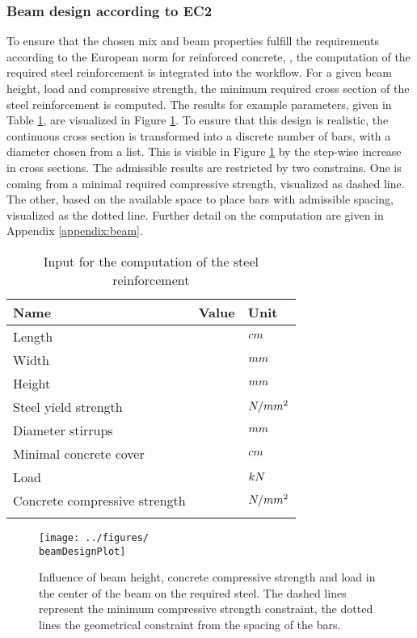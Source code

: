 \subsubsection{Beam design according to EC2}
To ensure that the chosen mix and beam properties fulfill the requirements according to the European norm for reinforced concrete, \cite{DIN1992-1-1}, the computation of the required steel reinforcement is integrated into the workflow.
For a given beam height, load and compressive strength, the minimum required cross section of the steel reinforcement is computed.
The results for example parameters, given in Table \ref{tab:beamdesigninput}, are visualized in Figure \ref{fig:beamdesign}.
To ensure that this design is realistic, the continuous cross section is transformed into a discrete number of bars, with a diameter chosen from a list.
This is visible in Figure \ref{fig:beamdesign} by the step-wise increase in cross sections.
The admissible results are restricted by two constrains.
One is coming from a minimal required compressive strength, visualized as dashed line.
The other, based on the available space to place bars with admissible spacing, visualized as the dotted line.
Further detail on the computation are given in Appendix \ref{appendix:beam}.
\begin{table}[ht]
	\begin{center}
		\begin{minipage}{.9\textwidth}
			\caption{Input for the computation of the steel reinforcement}\label{tab:beamdesigninput}
			\begin{tabular}{lrl}
				\toprule
				Name &  Value&Unit\\
				\midrule
				Length & \beamExSpan &$cm$\\
				Width & \beamExWidth &$mm$\\
				Height& \beamExHeightC &$mm$\\
				Steel yield strength& \beamExYieldStrSteel &$N/mm^2$\\
				Diameter stirrups& \beamExSteelDiaBu &$mm$\\
				Minimal concrete cover& \beamExCoverMin &$cm$\\
				Load& \beamExPointLoadC &$kN$\\
				Concrete compressive strength& \beamExComprStrConcreteC &$N/mm^2$\\
				\botrule
			\end{tabular}
		\end{minipage}
	\end{center}
\end{table}
\begin{figure}[ht]%
	\centering
	\texttt{[image: ../figures/\\beamDesignPlot]}
	\caption{Influence of beam height, concrete compressive strength and load in the center of the beam on the required steel. The dashed lines represent the minimum compressive strength constraint, the dotted lines the geometrical constraint from the spacing of the bars.}\label{fig:beamdesign}
\end{figure}